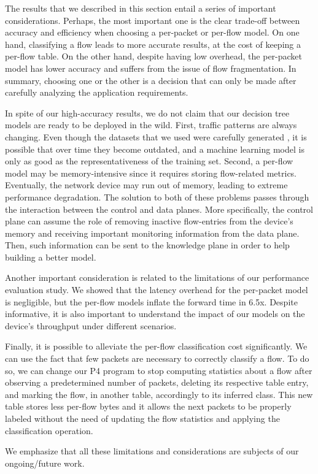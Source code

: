 The results that we described in this section entail a series of important considerations. Perhaps, the most important one is the clear trade-off between accuracy and efficiency when choosing a per-packet or per-flow model. On one hand, classifying a flow leads to more accurate results, at the cost of keeping a per-flow table. On the other hand, despite having low overhead, the per-packet model has lower accuracy and suffers from the issue of flow fragmentation. In summary, choosing one or the other is a decision that can only be made after carefully analyzing the application requirements. 

In spite of our high-accuracy results, we do not claim that our decision tree models are ready to be deployed in the wild. First, traffic patterns are always changing. Even though the datasets that we used were carefully generated \cite{sharafaldin2018toward}, it is possible that over time they become outdated, and a machine learning model is only as good as the representativeness of the training set. Second, a per-flow model may be memory-intensive since it requires storing flow-related metrics. Eventually, the network device may run out of memory, leading to extreme performance degradation. The solution to both of these problems passes through the interaction between the control and data planes. More specifically, the control plane can assume the role of removing inactive flow-entries from the device's memory and receiving important monitoring information from the data plane. Then, such information can be sent to the knowledge plane in order to help building a better model. 

Another important consideration is related to the limitations of our performance evaluation study. We showed that the latency overhead for the per-packet model is negligible, but the per-flow models inflate the forward time in 6.5x. Despite informative, it is also important to understand the impact of our models on the device's throughput under different scenarios.

Finally, it is possible to alleviate the per-flow classification cost significantly. We can use the fact that few packets are necessary to correctly classify a flow. To do so, we can change our P4 program to stop computing statistics about a flow after observing a predetermined number of packets, deleting its respective table entry, and marking the flow, in another table, accordingly to its inferred class. This new table stores less per-flow bytes and it allows the next packets to be properly labeled without the need of updating the flow statistics and applying the classification operation.

We emphasize that all these limitations and considerations are subjects of our ongoing/future work.



